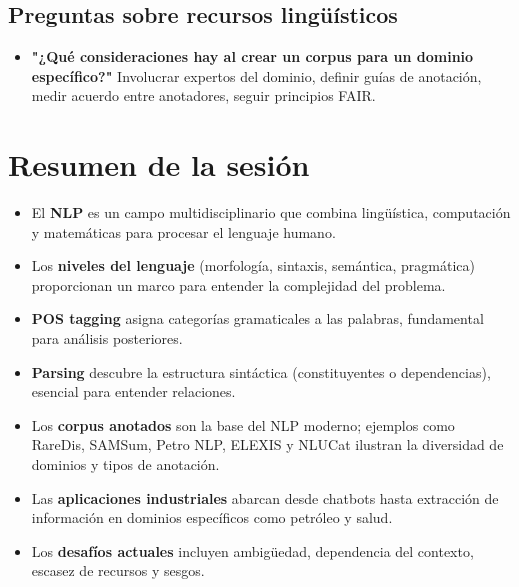\documentclass[12pt,a4paper,openany,oneside]{book}
\begin{document}
\subsection{Preguntas sobre recursos lingüísticos}
\begin{itemize}
    \item \textbf{"¿Qué consideraciones hay al crear un corpus para un dominio específico?"}
    Involucrar expertos del dominio, definir guías de anotación, medir acuerdo entre anotadores, seguir principios FAIR.
\end{itemize}



\section{Resumen de la sesión}
\begin{itemize}
    \item El \textbf{NLP} es un campo multidisciplinario que combina lingüística, computación y matemáticas para procesar el lenguaje humano.
    \item Los \textbf{niveles del lenguaje} (morfología, sintaxis, semántica, pragmática) proporcionan un marco para entender la complejidad del problema.
    \item \textbf{POS tagging} asigna categorías gramaticales a las palabras, fundamental para análisis posteriores.
    \item \textbf{Parsing} descubre la estructura sintáctica (constituyentes o dependencias), esencial para entender relaciones.
    \item Los \textbf{corpus anotados} son la base del NLP moderno; ejemplos como RareDis, SAMSum, Petro NLP, ELEXIS y NLUCat ilustran la diversidad de dominios y tipos de anotación.
    \item Las \textbf{aplicaciones industriales} abarcan desde chatbots hasta extracción de información en dominios específicos como petróleo y salud.
    \item Los \textbf{desafíos actuales} incluyen ambigüedad, dependencia del contexto, escasez de recursos y sesgos.
\end{itemize}
\end{document}

